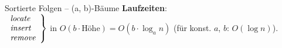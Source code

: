 \begin{frame}{Sortierte Folgen -- (a, b)-Bäume}
	\textbf{Laufzeiten}: \\[.5\baselineskip]
	$\casesr{\textit{locate} \\ \textit{insert} \\ \textit{remove}}$ in $O(b \cdot \text{Höhe}) = O(b \cdot \log_a n)$ \quad (für konst. $a$, $b$: $O(\log n)$).
\end{frame}


